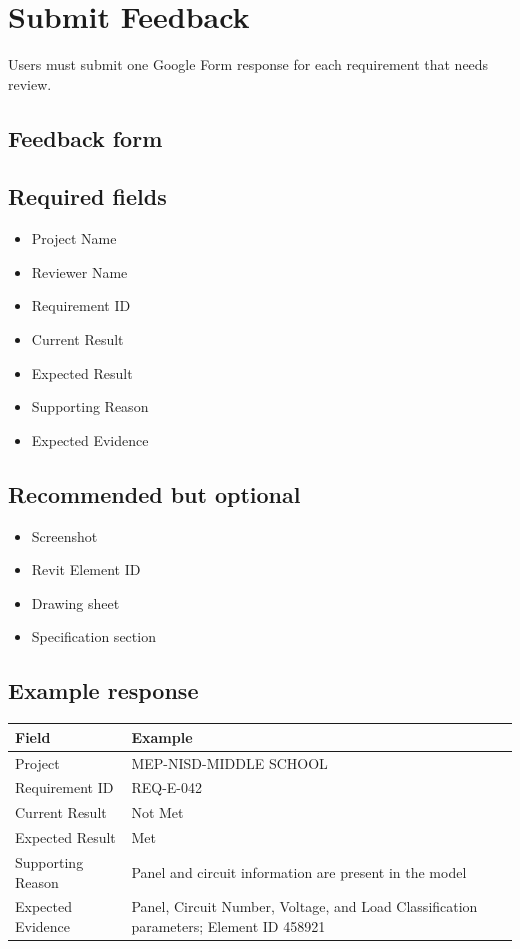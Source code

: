 \section{Submit Feedback}
Users must submit one Google Form response for each requirement that needs review.

\subsection*{Feedback form}
\begin{center}
\end{center}

\subsection*{Required fields}
\begin{itemize}
  \item Project Name
  \item Reviewer Name
  \item Requirement ID
  \item Current Result
  \item Expected Result
  \item Supporting Reason
  \item Expected Evidence
\end{itemize}

\subsection*{Recommended but optional}
\begin{itemize}
  \item Screenshot
  \item Revit Element ID
  \item Drawing sheet
  \item Specification section
\end{itemize}

\subsection*{Example response}
\begin{longtable}{@{}p{}p{}@{}}
\toprule
\textbf{Field} & \textbf{Example} \\
\midrule
Project & MEP-NISD-MIDDLE SCHOOL \\
Requirement ID & REQ-E-042 \\
Current Result & Not Met \\
Expected Result & Met \\
Supporting Reason & Panel and circuit information are present in the model \\
Expected Evidence & Panel, Circuit Number, Voltage, and Load Classification parameters; Element ID 458921 \\
\bottomrule
\end{longtable}

